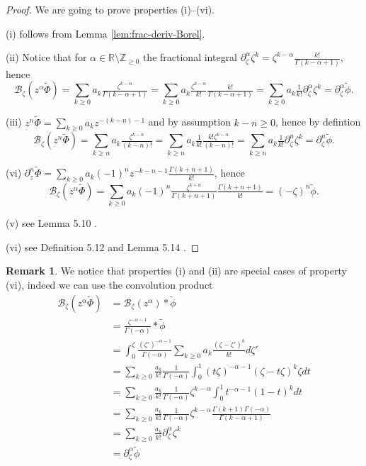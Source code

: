 \documentclass{article}
\theoremstyle{definition}
\newcommand{\Z}{\mathbb{Z}}
\newcommand{\R}{\mathbb{R}}
\newcommand{\borel}{\mathcal{B}}
\newtheorem{remark}[definition]{Remark}
\begin{document}
\begin{proof} 

We are going to prove properties (i)--(vi). 

(i) follows from Lemma \ref{lem:frac-deriv-Borel}. 

(ii) Notice that for $\alpha\in\R\setminus\Z_{\geq 0}$ the fractional integral $\partial_\zeta^{\alpha}\zeta^{k}=\zeta^{k-\alpha}\tfrac{k!}{\Gamma(k-\alpha+1)}$, hence \[\borel_\zeta (z^\alpha \tilde{\Phi})=\sum_{k\geq 0}a_k\tfrac{\zeta^{k-\alpha}}{\Gamma(k-\alpha+1)}=\sum_{k\geq 0}a_k\tfrac{\zeta^{k-\alpha}}{k!}\tfrac{k!}{\Gamma(k-\alpha+1)}=\sum_{k\geq 0}a_k \tfrac{1}{k!}\partial_\zeta^{\alpha}\zeta^k=\partial_\zeta^\alpha\tilde{\phi}.\]

(iii) $z^n\tilde{\Phi}=\sum_{k\geq 0}a_kz^{-(k-n)-1} $ and by assumption $k-n\geq 0$, hence by defintion \[\borel_\zeta (z^n \tilde{\Phi})=\sum_{k\geq n} a_k\tfrac{\zeta^{k-n}}{(k-n)!}=\sum_{k\geq n} a_k\tfrac{1}{k!}\tfrac{k!\zeta^{k-n}}{(k-n)!}=\sum_{k\geq n} a_k\tfrac{1}{k!}\partial_\zeta^n\zeta^k=\partial_\zeta^n\tilde{\phi}.\] 

(vi) $\partial_z^n \tilde{\Phi}=\sum_{k\geq 0}a_k(-1)^{n}z^{-k-n-1}\tfrac{\Gamma(k+n+1)}{k!}$, hence \[\borel_\zeta (z^\alpha \tilde{\Phi})=\sum_{k\geq 0}a_k(-1)^{n}\tfrac{\zeta^{k+n}}{\Gamma(k+n+1)}\tfrac{\Gamma(k+n+1)}{k!}=(-\zeta)^{n}\tilde{\phi}.\]

(v) see Lemma 5.10 \cite{MS16}. 

(vi) see Definition 5.12 and Lemma 5.14 \cite{MS16}. 
\end{proof}

\begin{remark}
We notice that properties (i) and (ii) are special cases of property (vi), indeed we can use the convolution product 
\begin{align*}
\borel_\zeta (z^\alpha \tilde{\Phi})&=\borel_\zeta (z^\alpha)\ast \tilde{\phi}\\
&=\frac{\zeta^{-\alpha-1}}{\Gamma(-\alpha)}\ast\tilde{\phi}\\
&=\int_0^\zeta \frac{(\zeta')^{-\alpha-1}}{\Gamma(-\alpha)}\sum_{k\geq 0}a_k\frac{(\zeta-\zeta')^k}{k!}d\zeta'\\
&=\sum_{k\geq 0}\frac{a_k}{k!}\frac{1}{\Gamma(-\alpha)}\int_0^1(t\zeta)^{-\alpha-1}(\zeta-t\zeta)^k\zeta dt\\
&=\sum_{k\geq 0}\frac{a_k}{k!}\frac{1}{\Gamma(-\alpha)}\zeta^{k-\alpha}\int_0^1 t^{-\alpha-1}(1-t)^k dt\\
&=\sum_{k\geq 0}\frac{a_k}{k!}\frac{1}{\Gamma(-\alpha)}\zeta^{k-\alpha}\frac{\Gamma(k+1)\Gamma(-\alpha)}{\Gamma(k-\alpha+1)}\\
&=\sum_{k\geq 0}\frac{a_k}{k!}\partial_\zeta^{\alpha} \zeta^k \\
&=\partial_\zeta^\alpha\tilde{\phi}
\end{align*}
\end{remark}
\end{document}
